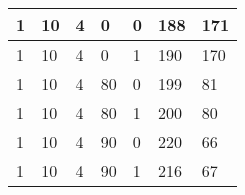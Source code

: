 \documentclass{article}
\theoremstyle{definition}
\begin{document}
\begin{table}[]
\begin{tabular}{|l|l|l|l|l|l|l|}
1                                      & 10                                      & 4                                      & 0                                    & 0                                      & 188                                      & 171                                    \\ \hline
1                                      & 10                                      & 4                                      & 0                                    & 1                                      & 190                                      & 170                                    \\ \hline
1                                      & 10                                      & 4                                      & 80                                   & 0                                      & 199                                      & 81                                     \\ \hline
1                                      & 10                                      & 4                                      & 80                                   & 1                                      & 200                                      & 80                                     \\ \hline
1                                      & 10                                      & 4                                      & 90                                   & 0                                      & 220                                      & 66                                     \\ \hline
1                                      & 10                                      & 4                                      & 90                                   & 1                                      & 216                                      & 67                                     \\ \hline

\end{tabular}
\end{table}
\end{document}
